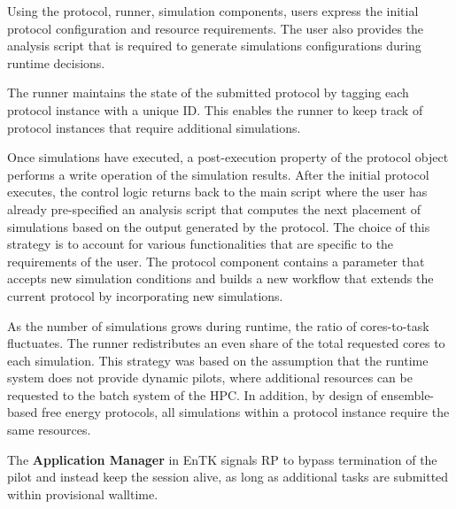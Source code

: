 Using the protocol, runner, simulation components, users express the initial 
protocol configuration and resource requirements. The user also provides the 
analysis script that is required to generate simulations configurations during 
runtime decisions. 


The runner maintains the state of the submitted protocol by tagging each 
protocol instance with a unique ID. This enables the runner to keep track of
protocol instances that require additional simulations. 

Once simulations have executed, a post-execution property of the protocol object
performs a write operation of the simulation results. After the initial protocol 
executes, the control logic returns back to the main script where the user has 
already pre-specified an analysis script that computes the next placement of 
simulations based on the output generated by the protocol. The choice of this 
strategy is to account for various functionalities that are specific to the 
requirements of the user. The protocol component contains a parameter that 
accepts new simulation conditions and builds a new workflow that extends the 
current protocol by incorporating new simulations.

As the number of simulations grows during runtime, the ratio of cores-to-task 
fluctuates. The runner redistributes an even share of the total requested cores 
to each simulation. This strategy was based on the assumption that the runtime 
system does not provide dynamic pilots, where additional resources can be 
requested to the batch system of the HPC. In addition, by design of 
ensemble-based free energy protocols, all simulations within a protocol instance
require the same resources. 

The \textbf{Application Manager} in EnTK signals RP to 
bypass termination of the pilot and instead keep the session alive, as long as 
additional tasks are submitted within provisional walltime. 



